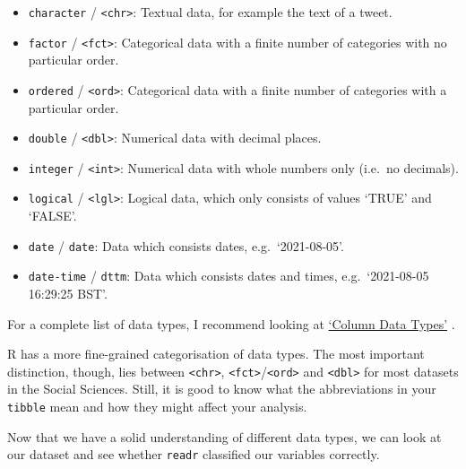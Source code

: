 \documentclass[
]{book}
\begin{document}
\begin{itemize}
\item
  \texttt{character} / \texttt{\textless{}chr\textgreater{}}: Textual data, for example the text of a tweet.
\item
  \texttt{factor} / \texttt{\textless{}fct\textgreater{}}: Categorical data with a finite number of categories with no particular order.
\item
  \texttt{ordered} / \texttt{\textless{}ord\textgreater{}}: Categorical data with a finite number of categories with a particular order.
\item
  \texttt{double} / \texttt{\textless{}dbl\textgreater{}}: Numerical data with decimal places.
\item
  \texttt{integer} / \texttt{\textless{}int\textgreater{}}: Numerical data with whole numbers only (i.e.~no decimals).
\item
  \texttt{logical} / \texttt{\textless{}lgl\textgreater{}}: Logical data, which only consists of values `TRUE' and `FALSE'.
\item
  \texttt{date} / \texttt{date}: Data which consists dates, e.g.~`2021-08-05'.
\item
  \texttt{date-time} / \texttt{dttm}: Data which consists dates and times, e.g.~`2021-08-05 16:29:25 BST'.
\end{itemize}

For a complete list of data types, I recommend looking at \href{https://tibble.tidyverse.org/articles/types.html}{`Column Data Types'} \citep{data-types-2021}.

R has a more fine-grained categorisation of data types. The most important distinction, though, lies between \texttt{\textless{}chr\textgreater{}}, \texttt{\textless{}fct\textgreater{}}/\texttt{\textless{}ord\textgreater{}} and \texttt{\textless{}dbl\textgreater{}} for most datasets in the Social Sciences. Still, it is good to know what the abbreviations in your \texttt{tibble} mean and how they might affect your analysis.

Now that we have a solid understanding of different data types, we can look at our dataset and see whether \texttt{readr} classified our variables correctly.
\end{document}
